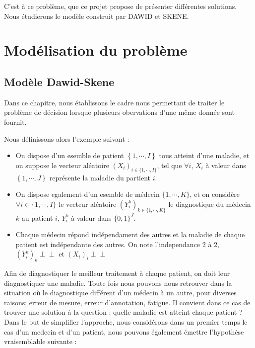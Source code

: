 \documentclass[frenchb]{report}
\newcommand{\1}{\mathbbm{1}}
\newcommand{\indep}{\perp \!\!\! \perp}
\theoremstyle{definition}\newtheorem{defn}{Définition}
\theoremstyle{definition}\newtheorem{exm}{Exemple}
\theoremstyle{definition}\newtheorem{nota}{Notation}
\theoremstyle{definition}\newtheorem{rem}{Remarque}
\begin{document}
C'est à ce problème, que ce projet propose de présenter différentes solutions. Nous étudierons le modèle construit par DAWID et SKENE.


\newpage

\chapter{Modélisation du problème}

\section{Modèle Dawid-Skene}

Dans ce chapitre, nous établissons le cadre nous permettant de traiter le problème de décision lorsque plusieurs obervations d'une même donnée sont fournit. 

Nous définissons alors l'exemple suivant : 

\begin{itemize}[label=\adfflowerleft]
	\item On dispose d'un esemble de patient $\left\{1,\cdots,I\right\}$ tous atteint d'une maladie, et on suppose le vecteur aléatoire $(X_i)_{i \in \{1,\cdots,I \}}$, tel que $\forall i$, $X_i$ à valeur dans $\left\{1,\cdots,J\right\}$ représente la maladie du partient $i$.
	\item On dispose egalement d'un esemble de médecin $\{1, \cdots, K\}$, et on considère $\forall i \in \{1, \cdots, I\}$ le vecteur aléatoire $(Y^k_i)_{k \in \{1, \cdots, K\}}$ le diagnostique du médecin $k$ au patient $i$, $Y^k_i$ à valeur dans $\{0,1\}^J$. 
	\item Chaque médecin répond indépendament des autres et la maladie de chaque patient est indépendante des autres. On note l'independance 2 à 2, $(Y^k_i)_k \indep$ et $(X_i)_i \indep$
\end{itemize}

Afin de diagnostiquer le meilleur traitement à chaque patient, on doit leur diagnostiquer une maladie. Toute fois nous pouvons nous retrouver dans la situation où le diagnostique différent d'un médecin à un autre, pour diverses raisons; erreur de mesure, erreur d'annotation, fatigue. Il convient dans ce cas de trouver une solution à la question : quelle maladie est atteint chaque patient ? \\

Dans le but de simplifier l'approche, nous considérons dans un premier temps le cas d'un medecin et d'un patient, nous pouvons également émettre l'hypothèse vraisemblable suivante : \\
\end{document}
